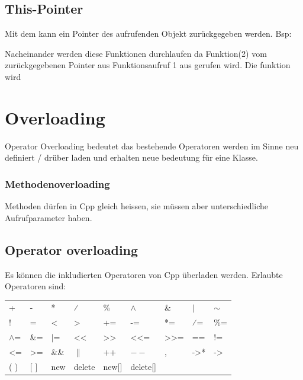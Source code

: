 \subsection{This-Pointer}

Mit dem  kann ein Pointer des aufrufenden Objekt zurückgegeben werden. Bsp:



Nacheinander werden diese Funktionen durchlaufen da Funktion(2) vom zurückgegebenen Pointer aus Funktionsaufruf 1 aus gerufen wird.
Die funktion wird 


\section{Overloading}

Operator Overloading bedeutet das bestehende Operatoren  werden im Sinne neu definiert / drüber laden und erhalten neue bedeutung für eine Klasse. 


\subsubsection{Methodenoverloading}

Methoden dürfen in Cpp gleich heissen, sie müssen aber unterschiedliche Aufrufparameter haben.



\subsection{Operator overloading}

Es können die inkludierten Operatoren von Cpp überladen werden. 
Erlaubte Operatoren sind:\\
\begin{tabular}{lllllllll}
    +            & -               & *           & ⁄                      & \%                           & $\wedge$                & \&                            & $|$              & $\sim$          \\
    !            & =               & \textless{} & \textgreater{}         & +=                           & -=                      & *=                            & ⁄=               & \%=             \\
    $\wedge$=    & \&=             & $|$=        & \textless{}\textless{} & \textgreater{}\textgreater{} & \textless{}\textless{}= & \textgreater{}\textgreater{}= & ==               & !=              \\
    \textless{}= & \textgreater{}= & \&\&        & $\|$                   & ++                           & $--$                    & ,                             & -\textgreater{}* & -\textgreater{} \\
    ( )          & {[} {]}         & new         & delete                 & new{[}{]}                    & delete{[}{]}            &                               &                  &                
\end{tabular}

